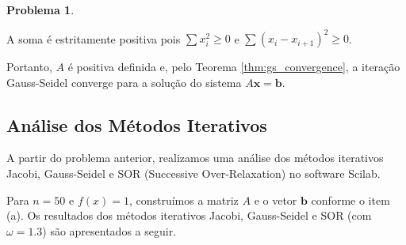 \documentclass{article}
\theoremstyle{plain}
\theoremstyle{definition}
\newtheorem{prblm}[defn]{Problema}
\theoremstyle{remark}
\begin{document}
\begin{prblm}
\begin{enumerate}
    A soma é estritamente positiva pois \(\sum x_i^2 \geq 0\) e \(\sum (x_i - x_{i+1})^2 \geq 0\).

    Portanto, \(A\) é positiva definida e, pelo Teorema \ref{thm:gs_convergence}, a iteração Gauss-Seidel converge para a solução do sistema \(A\mathbf{x} = \mathbf{b}\).
  \end{enumerate}
\end{prblm}

\subsection{Análise dos Métodos Iterativos}

A partir do problema anterior, realizamos uma análise dos métodos iterativos Jacobi, Gauss-Seidel e SOR (Successive Over-Relaxation) no software Scilab.

Para \(n = 50\) e \(f(x) = 1\), construímos a matriz \(A\) e o vetor \(\mathbf{b}\) conforme o item (a). Os resultados dos métodos iterativos Jacobi, Gauss-Seidel e SOR (com \(\omega = 1.3\)) são apresentados a seguir.
\end{document}
